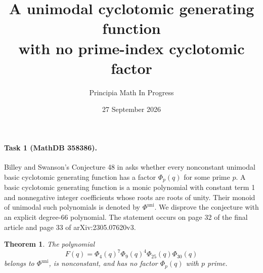 \documentclass[11pt]{article}
\title{A unimodal cyclotomic generating function\protect\\with no prime-index cyclotomic factor}
\author{Principia Math In Progress}
\date{27 September 2026}
\newtheorem{theorem}{Theorem}
\newcommand{\Phiuni}{\Phi^{\mathrm{uni}}}
\begin{document}
\maketitle

\paragraph{Task 1 (MathDB 358386).}
Billey and Swanson's Conjecture 48 in \cite{BS} asks whether every
nonconstant unimodal basic cyclotomic generating function has a factor
$\Phi_p(q)$ for some prime $p$. A basic cyclotomic generating function is a
monic polynomial with constant term 1 and nonnegative integer coefficients
whose roots are roots of unity. Their monoid of unimodal such polynomials
is denoted by $\Phiuni$. We disprove the conjecture with an explicit
degree-66 polynomial. The statement occurs on page 32 of the final
article and page 33 of arXiv:2305.07620v3.

\begin{theorem}
The polynomial
\[
 F(q)=\Phi_4(q)^7\Phi_9(q)^4\Phi_{25}(q)\Phi_{30}(q)
\]
belongs to $\Phiuni$, is nonconstant, and has no factor $\Phi_p(q)$
with $p$ prime.
\end{theorem}
\end{document}
